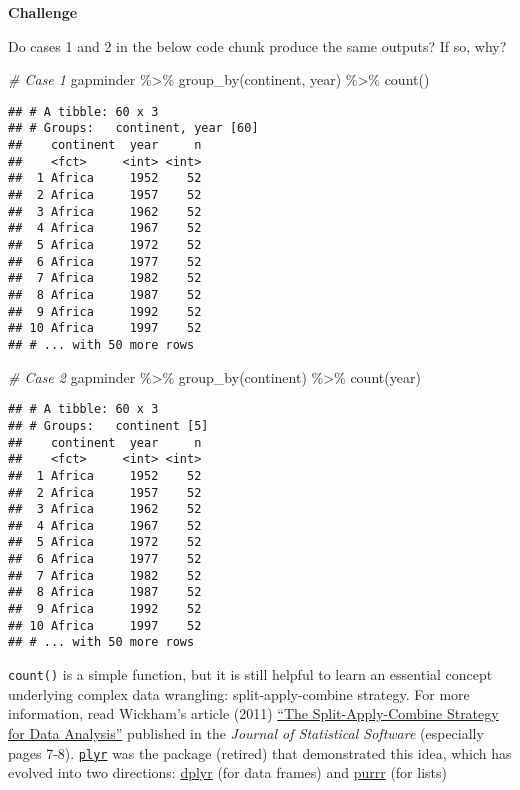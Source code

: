 \documentclass[
]{book}
\newenvironment{Shaded}{\begin{snugshade}}{\end{snugshade}}
\newcommand{\CommentTok}[1]{\textcolor[rgb]{0.56,0.35,0.01}{\textit{#1}}}
\newcommand{\FunctionTok}[1]{\textcolor[rgb]{0.00,0.00,0.00}{#1}}
\newcommand{\NormalTok}[1]{#1}
\newcommand{\SpecialCharTok}[1]{\textcolor[rgb]{0.00,0.00,0.00}{#1}}
\begin{document}
\textbf{Challenge}

Do cases 1 and 2 in the below code chunk produce the same outputs? If so, why?

\begin{Shaded}
\begin{Highlighting}[]
\CommentTok{\# Case 1}
\NormalTok{gapminder }\SpecialCharTok{\%\textgreater{}\%}
  \FunctionTok{group\_by}\NormalTok{(continent, year) }\SpecialCharTok{\%\textgreater{}\%}
  \FunctionTok{count}\NormalTok{()}
\end{Highlighting}
\end{Shaded}

\begin{verbatim}
## # A tibble: 60 x 3
## # Groups:   continent, year [60]
##    continent  year     n
##    <fct>     <int> <int>
##  1 Africa     1952    52
##  2 Africa     1957    52
##  3 Africa     1962    52
##  4 Africa     1967    52
##  5 Africa     1972    52
##  6 Africa     1977    52
##  7 Africa     1982    52
##  8 Africa     1987    52
##  9 Africa     1992    52
## 10 Africa     1997    52
## # ... with 50 more rows
\end{verbatim}

\begin{Shaded}
\begin{Highlighting}[]
\CommentTok{\# Case 2}
\NormalTok{gapminder }\SpecialCharTok{\%\textgreater{}\%}
  \FunctionTok{group\_by}\NormalTok{(continent) }\SpecialCharTok{\%\textgreater{}\%}
  \FunctionTok{count}\NormalTok{(year)}
\end{Highlighting}
\end{Shaded}

\begin{verbatim}
## # A tibble: 60 x 3
## # Groups:   continent [5]
##    continent  year     n
##    <fct>     <int> <int>
##  1 Africa     1952    52
##  2 Africa     1957    52
##  3 Africa     1962    52
##  4 Africa     1967    52
##  5 Africa     1972    52
##  6 Africa     1977    52
##  7 Africa     1982    52
##  8 Africa     1987    52
##  9 Africa     1992    52
## 10 Africa     1997    52
## # ... with 50 more rows
\end{verbatim}

\texttt{count()} is a simple function, but it is still helpful to learn an essential concept underlying complex data wrangling: split-apply-combine strategy. For more information, read Wickham's article (2011) \href{http://citeseerx.ist.psu.edu/viewdoc/download?doi=10.1.1.182.5667\&rep=rep1\&type=pdf}{``The Split-Apply-Combine Strategy for Data Analysis''} published in the \emph{Journal of Statistical Software} (especially pages 7-8). \href{https://github.com/hadley/plyr}{\texttt{plyr}} was the package (retired) that demonstrated this idea, which has evolved into two directions: \href{https://dplyr.tidyverse.org/}{dplyr} (for data frames) and \href{https://purrr.tidyverse.org/}{purrr} (for lists)
\end{document}
